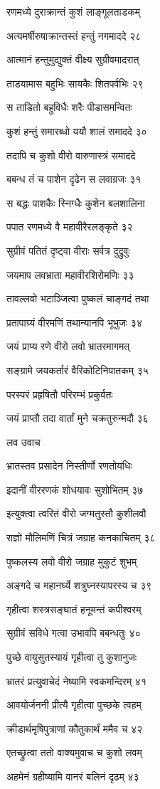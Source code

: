 रणमध्ये दुराक्रान्तं कुशं लाङ्गूलताडकम्

अत्यमर्षीरुषाक्रान्तस्तं हन्तुं नगमाददे २८

आत्मानं हन्तुमुद्युक्तं वीक्ष्य सुग्रीवमादरात्

ताडयामास बहुभिः सायकैः शितपर्वभिः २९

स ताडितो बहुविधैः शरैः पीडासमन्वितः

कुशं हन्तुं समारब्धो ययौ शालं समाददे ३०

तदापि च कुशो वीरो वारुणास्त्रं समाददे

बबन्ध तं च पाशेन दृढेन स लवाग्रजः ३१

स बद्धः पाशकैः स्निग्धैः कुशेन बलशालिना

पपात रणमध्ये वै महावीरैरलङ्कृते ३२

सुग्रीवं पतितं दृष्ट्वा वीराः सर्वत्र दुद्रुवुः

जयमाप लवभ्राता महावीरशिरोमणिः ३३

तावल्लवो भटाञ्जित्वा पुष्कलं चाङ्गदं तथा

प्रतापाग्र्यं वीरमणिं तथान्यानपि भूभुजः ३४

जयं प्राप्य रणे वीरो लवो भ्रातरमागमत्

सङ्ग्रामे जयकर्तारं वैरिकोटिनिपातकम् ३५

परस्परं प्रहृषितौ परिरम्भं प्रकुर्वतः

जयं प्राप्तौ तदा वार्तां मुने चक्रतुरुन्मदौ ३६

लव उवाच

भ्रातस्तव प्रसादेन निस्तीर्णो रणतोयधिः

इदानीं वीररणकं शोधयावः सुशोभितम् ३७

इत्युक्त्वा त्वरितं वीरो जग्मतुस्तौ कुशीलवौ

राज्ञो मौलिमणिं चित्रं जग्राह कनकाचितम् ३८

पुष्कलस्य लवो वीरो जग्राह मुकुटं शुभम्

अङ्गदे च महानर्घ्ये शत्रुघ्नस्यापरस्य च ३९

गृहीत्वा शस्त्रसङ्घातं हनूमन्तं कपीश्वरम्

सुग्रीवं सविधे गत्वा उभावपि बबन्धतुः ४०

पुच्छे वायुसुतस्यायं गृहीत्वा तु कुशानुजः

भ्रातरं प्रत्युवाचेदं नेष्यामि स्वकमन्दिरम् ४१

आवयोर्जननी प्रीत्यै गृहीत्वा पुच्छके त्वहम्

क्रीडार्थमृषिपुत्राणां कौतुकार्थं ममैव च ४२

एतच्छ्रुत्वा ततो वाक्यमुवाच च कुशो लवम्

अहमेनं ग्रहीष्यामि वानरं बलिनं दृढम् ४३

